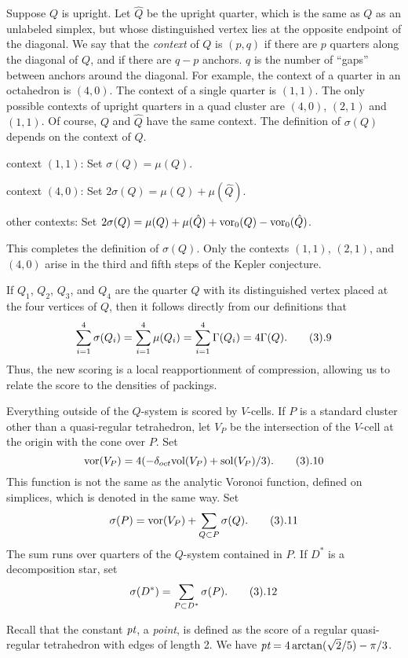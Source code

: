 Suppose $Q$ is upright.  Let $\hat Q$ be the upright quarter,
which is the same as $Q$ as an unlabeled simplex, but whose
distinguished vertex lies at the opposite endpoint of the diagonal.
We say that the {\it context\/} of $Q$ is $(p,q)$ if there are $p$ quarters
along the diagonal of $Q$, and if there are $q-p$ anchors.
$q$ is the number of ``gaps'' between anchors around the
diagonal.
For example, the context of
a quarter in an octahedron is $(4,0)$.  The context
of a single quarter is $(1,1)$.  The only possible contexts
of upright quarters in a quad cluster are $(4,0)$, $(2,1)$ and $(1,1)$.
Of course, $Q$ and $\hat Q$ have the same context.
The definition of $\sigma(Q)$ depends on the context of $Q$.

context $(1,1)$:  Set $\sigma(Q)=\mu(Q)$.

context $(4,0)$:  Set $2\sigma(Q)=\mu(Q)+\mu(\hat Q)$.

other contexts:  
 Set $2\sigma(Q)=\mu(Q)+\mu(\hat Q)+ \operatorname{vor}_0(Q) - \operatorname{vor}_0(\hat Q)$.

This completes the definition of $\sigma(Q)$.
Only the contexts $(1,1)$, $(2,1)$, and $(4,0)$
arise in the third and fifth steps of the
Kepler conjecture. 

If $Q_1$, $Q_2$, $Q_3$, and $Q_4$ are the quarter $Q$ with its
distinguished vertex placed at the four vertices of $Q$, then
it follows directly from our definitions that
$$\sum_{i=1}^4 \sigma(Q_i) = \sum_{i=1}^4\mu(Q_i)
	= \sum_{i=1}^4 \Gamma(Q_i)=4 \Gamma(Q).\tag3.9$$
Thus, the new scoring is a local reapportionment of compression,
allowing us to relate the score to the densities of packings.



Everything outside of the $Q$-system
is scored by $V$-cells.  If $P$ is a standard cluster other
than a quasi-regular tetrahedron, let $V_P$
be the intersection of the $V$-cell at the origin with
the cone over $P$.  Set 
$$\vor(V_P) = 4(-\doct\Vol(V_P)+\sol(V_P)/3).\tag3.10$$
This function is not the same as the analytic Voronoi function,
defined on simplices, which is denoted in the same way.
Set $$\sigma(P) = \vor(V_P)+\sum_{Q\subset P} \sigma(Q).\tag3.11$$
The sum runs over quarters of the $Q$-system contained in $P$.
If $D^*$ is a decomposition star, set $$\sigma(D^*)=\sum_{P\subset D^*}
	\sigma(P).\tag3.12$$

Recall that the constant $\hbox{\it pt}$,
a {\it point},  is defined as the score of a regular
quasi-regular tetrahedron with edges of length 2. We have
$\hbox{\it pt} = 4\arctan(\sqrt2/5) - \pi/3$.

